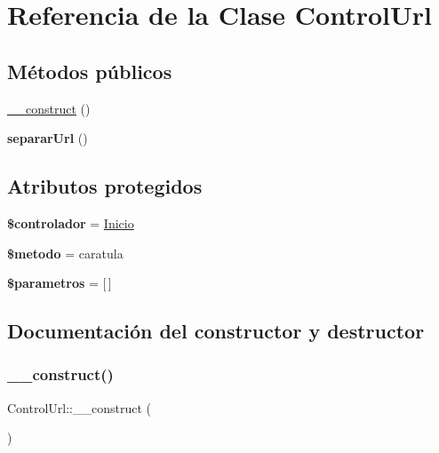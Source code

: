 \hypertarget{classControlUrl}{}\section{Referencia de la Clase Control\+Url}
\label{classControlUrl}
\subsection*{Métodos públicos}
\begin{DoxyCompactItemize}
\item 
\hyperlink{classControlUrl_a97834b10c232616287ad8c8ba4f32564}{\+\_\+\+\_\+construct} ()
\item 
\mbox{\label{classControlUrl_a16e8b073b5b36bcfe449bb378d2446f1}} 
{\bfseries separar\+Url} ()
\end{DoxyCompactItemize}
\subsection*{Atributos protegidos}
\begin{DoxyCompactItemize}
\item 
\mbox{\label{classControlUrl_a8cab4c94c753397deff1a18347b555a0}} 
{\bfseries \$controlador} = \textquotesingle{}\hyperlink{classInicio}{Inicio}\textquotesingle{}
\item 
\mbox{\label{classControlUrl_a07bc90665b2244740ffb23605fef7997}} 
{\bfseries \$metodo} = \textquotesingle{}caratula\textquotesingle{}
\item 
\mbox{\label{classControlUrl_a2b23d5226ed70c6bdf3b354b6e856e50}} 
{\bfseries \$parametros} = \mbox{[}$\,$\mbox{]}
\end{DoxyCompactItemize}


\subsection{Documentación del constructor y destructor}
\mbox{\label{classControlUrl_a97834b10c232616287ad8c8ba4f32564}} 
\subsubsection{\texorpdfstring{\+\_\+\+\_\+construct()}{\_\_construct()}}
{\footnotesize\ttfamily Control\+Url\+::\+\_\+\+\_\+construct (\begin{DoxyParamCaption}{ }\end{DoxyParamCaption})}

